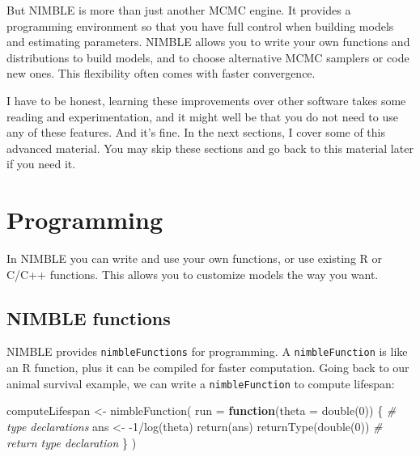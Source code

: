 \documentclass[
  12pt,
]{krantz}
\newenvironment{Shaded}{\begin{snugshade}}{\end{snugshade}}
\newcommand{\AttributeTok}[1]{\textcolor[rgb]{0.77,0.63,0.00}{#1}}
\newcommand{\CommentTok}[1]{\textcolor[rgb]{0.56,0.35,0.01}{\textit{#1}}}
\newcommand{\ControlFlowTok}[1]{\textcolor[rgb]{0.13,0.29,0.53}{\textbf{#1}}}
\newcommand{\DecValTok}[1]{\textcolor[rgb]{0.00,0.00,0.81}{#1}}
\newcommand{\FunctionTok}[1]{\textcolor[rgb]{0.00,0.00,0.00}{#1}}
\newcommand{\NormalTok}[1]{#1}
\newcommand{\OtherTok}[1]{\textcolor[rgb]{0.56,0.35,0.01}{#1}}
\newcommand{\SpecialCharTok}[1]{\textcolor[rgb]{0.00,0.00,0.00}{#1}}
\begin{document}
But NIMBLE is more than just another MCMC engine. It provides a programming environment so that you have full control when building models and estimating parameters. NIMBLE allows you to write your own functions and distributions to build models, and to choose alternative MCMC samplers or code new ones. This flexibility often comes with faster convergence.

I have to be honest, learning these improvements over other software takes some reading and experimentation, and it might well be that you do not need to use any of these features. And it's fine. In the next sections, I cover some of this advanced material. You may skip these sections and go back to this material later if you need it.

\hypertarget{functions-in-nimble}{%
\section{Programming}\label{functions-in-nimble}}

In NIMBLE you can write and use your own functions, or use existing R or C/C++ functions. This allows you to customize models the way you want.

\hypertarget{nimble-functions}{%
\subsection{NIMBLE functions}\label{nimble-functions}}

NIMBLE provides \texttt{nimbleFunctions} for programming. A \texttt{nimbleFunction} is like an R function, plus it can be compiled for faster computation. Going back to our animal survival example, we can write a \texttt{nimbleFunction} to compute lifespan:

\begin{Shaded}
\begin{Highlighting}[]
\NormalTok{computeLifespan }\OtherTok{\textless{}{-}} \FunctionTok{nimbleFunction}\NormalTok{(}
    \AttributeTok{run =} \ControlFlowTok{function}\NormalTok{(}\AttributeTok{theta =} \FunctionTok{double}\NormalTok{(}\DecValTok{0}\NormalTok{)) \{ }\CommentTok{\# type declarations}
\NormalTok{        ans }\OtherTok{\textless{}{-}} \SpecialCharTok{{-}}\DecValTok{1}\SpecialCharTok{/}\FunctionTok{log}\NormalTok{(theta)}
        \FunctionTok{return}\NormalTok{(ans)}
        \FunctionTok{returnType}\NormalTok{(}\FunctionTok{double}\NormalTok{(}\DecValTok{0}\NormalTok{))  }\CommentTok{\# return type declaration}
\NormalTok{    \} )}
\end{Highlighting}
\end{Shaded}
\end{document}
